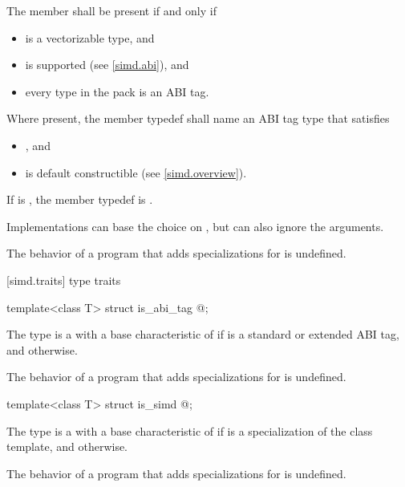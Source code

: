 \begin{itemdescr}
\pnum
The member  shall be present if and only if
\begin{itemize}
  \item {} is a vectorizable type, and
  \item {} is supported (see \ref{simd.abi}), and
  \item every type in the  pack is an ABI tag.
\end{itemize}

\pnum
Where present, the member typedef  shall name an ABI tag type that satisfies
\begin{itemize}
  \item {}, and
  \item {} is default constructible (see \ref{simd.overview}).
\end{itemize}
If  is , the member typedef  is .
\begin{note}
  Implementations can base the choice on , but can also ignore the  arguments.
\end{note}

\pnum
The behavior of a program that adds specializations for  is undefined.
\end{itemdescr}

[simd.traits]{ type traits}

\begin{itemdecl}
template<class T> struct is_abi_tag { @\seebelow@ };
\end{itemdecl}

\begin{itemdescr}
\pnum
The type  is a  with a base characteristic of  if  is a standard or extended ABI tag, and  otherwise.

\pnum
The behavior of a program that adds specializations for  is undefined.
\end{itemdescr}

\begin{itemdecl}
template<class T> struct is_simd { @\seebelow@ };
\end{itemdecl}

\begin{itemdescr}
\pnum
The type  is a  with a base characteristic of  if  is a specialization of the  class template, and  otherwise.

\pnum
The behavior of a program that adds specializations for  is undefined.
\end{itemdescr}

